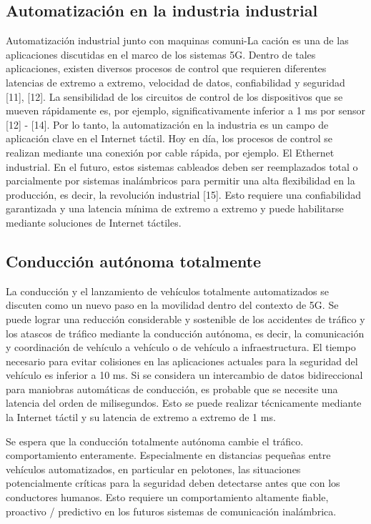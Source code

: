 \documentclass[12pt,journal,compsoc]{IEEEtran}
\begin{document}
\subsection{Automatización en la industria industrial}

Automatización industrial junto con maquinas comuni-La cación es una de las aplicaciones discutidas en el marco de los sistemas 5G. Dentro de tales aplicaciones, existen diversos procesos de control que requieren diferentes latencias de extremo a extremo, velocidad de datos, confiabilidad y seguridad [11], [12]. La sensibilidad de los circuitos de control de los dispositivos que se mueven rápidamente es, por ejemplo, significativamente inferior a 1 ms por sensor [12] - [14]. Por lo tanto, la automatización en la industria es un campo de aplicación clave en el Internet táctil. Hoy en día, los procesos de control se realizan mediante una conexión por cable rápida, por ejemplo. El Ethernet industrial. En el futuro, estos sistemas cableados deben ser reemplazados total o parcialmente por sistemas inalámbricos para permitir una alta flexibilidad en la producción, es decir, la revolución industrial [15]. Esto requiere una confiabilidad garantizada y una latencia mínima de extremo a extremo y puede habilitarse mediante soluciones de Internet táctiles.

\subsection{Conducción autónoma totalmente}

La conducción y el lanzamiento de vehículos totalmente automatizados se discuten como un nuevo paso en la movilidad dentro del contexto de 5G. Se puede lograr una reducción considerable y sostenible de los accidentes de tráfico y los atascos de tráfico mediante la conducción autónoma, es decir, la comunicación y coordinación de vehículo a vehículo o de vehículo a infraestructura. El tiempo necesario para evitar colisiones en las aplicaciones actuales para la seguridad del vehículo es inferior a 10 ms. Si se considera un intercambio de datos bidireccional para maniobras automáticas de conducción, es probable que se necesite una latencia del orden de milisegundos. Esto se puede realizar técnicamente mediante la Internet táctil y su latencia de extremo a extremo de 1 ms.

Se espera que la conducción totalmente autónoma cambie el tráfico. comportamiento enteramente. Especialmente en distancias pequeñas entre vehículos automatizados, en particular en pelotones, las situaciones potencialmente críticas para la seguridad deben detectarse antes que con los conductores humanos. Esto requiere un comportamiento altamente fiable, proactivo / predictivo en los futuros sistemas de comunicación inalámbrica.
\end{document}
